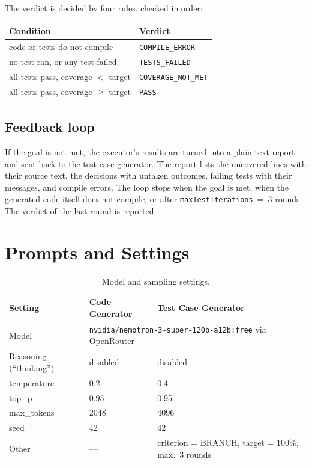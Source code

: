 \documentclass[11pt,a4paper]{article}
\begin{document}
\noindent The verdict is decided by four rules, checked in order:
\begin{center}
\begin{tabular}{@{}ll@{}}
\toprule
Condition & Verdict \\
\midrule
code or tests do not compile & \texttt{COMPILE\_ERROR} \\
no test ran, or any test failed & \texttt{TESTS\_FAILED} \\
all tests pass, coverage $<$ target & \texttt{COVERAGE\_NOT\_MET} \\
all tests pass, coverage $\geq$ target & \texttt{PASS} \\
\bottomrule
\end{tabular}
\end{center}

\subsection{Feedback loop}
If the goal is not met, the executor's results are turned into a plain-text report and sent back to the test case generator. The report lists the uncovered lines with their source text, the decisions with untaken outcomes, failing tests with their messages, and compile errors. The loop stops when the goal is met, when the generated code itself does not compile, or after \texttt{maxTestIterations}~=~3 rounds. The verdict of the last round is reported.

\section{Prompts and Settings}

\begin{table}[H]
\centering
\begin{tabular}{@{}lll@{}}
\toprule
Setting & Code Generator & Test Case Generator \\
\midrule
Model & \multicolumn{2}{l}{\texttt{nvidia/nemotron-3-super-120b-a12b:free} via OpenRouter} \\
Reasoning (``thinking'') & disabled & disabled \\
temperature & 0.2 & 0.4 \\
top\_p & 0.95 & 0.95 \\
max\_tokens & 2048 & 4096 \\
seed & 42 & 42 \\
Other & --- & criterion = BRANCH, target = 100\%, max.\ 3 rounds \\
\bottomrule
\end{tabular}
\caption{Model and sampling settings.}
\end{table}
\end{document}
